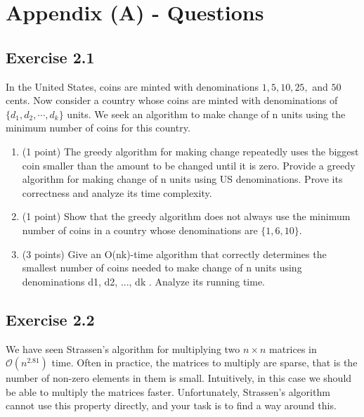 \documentclass[10pt,a4paper]{article}
\begin{document}
\break
\section*{Appendix (A) - Questions}
\subsection*{Exercise 2.1}
In the United States, coins are minted with denominations $1, 5, 10, 25,$ and $50$ cents. Now consider a country whose coins are minted with denominations of $\{d_1, d_2, \cdots, d_k\}$ units. We seek an algorithm to make change of n units using the minimum number of coins for this country.\\
\begin{enumerate}
\item (1 point) The greedy algorithm for making change repeatedly uses the biggest coin smaller than the amount to be changed until it is zero. Provide a greedy algorithm for making change of n units using US denominations. Prove its correctness and analyze its time complexity.\\
\item (1 point) Show that the greedy algorithm does not always use the minimum number of coins in a country whose denominations are $\{1, 6, 10\}$.\\
\item (3 points) Give an O(nk)-time algorithm that correctly determines the smallest number of coins needed to make change of n units using denominations {d1, d2, ..., dk} . Analyze its running time.
\end{enumerate}
\subsection*{Exercise 2.2}
We have seen Strassen's algorithm for multiplying two $n\times n$ matrices in $\mathcal{O}(n^2.81)$ time. Often in practice, the matrices to multiply are sparse, that is the number of non-zero elements in them is small. Intuitively, in this case we should be able to multiply the matrices faster. Unfortunately, Strassen's algorithm cannot use this property directly, and your task is to find a way around this.
\end{document}
